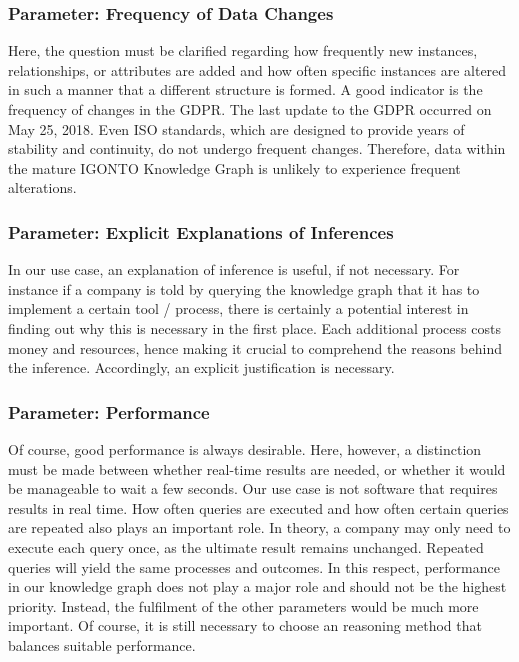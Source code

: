 \documentclass[
  a4paper,  %
  twoside,  %
  bibliography=totoc,
  headsepline,
  cleardoublepage=empty,
  parskip=half,
  draft=false
]{scrbook}
\begin{document}
\subsubsection{Parameter: Frequency of Data Changes}
Here, the question must be clarified regarding how frequently new instances, relationships, or attributes are added and how often specific instances are altered in such a manner that a different structure is formed. A good indicator is the frequency of changes in the \acrlong{GDPR}. The last update to the GDPR occurred on May 25, 2018. Even ISO standards, which are designed to provide years of stability and continuity, do not undergo frequent changes. Therefore, data within the mature IGONTO Knowledge Graph is unlikely to experience frequent alterations.

\subsubsection{Parameter: Explicit Explanations of Inferences}
In our use case, an explanation of inference is useful, if not necessary. For instance if a company is told by querying the knowledge graph that it has to implement a certain tool / process, there is certainly a potential interest in finding out why this is necessary in the first place. Each additional process costs money and resources, hence making it crucial to comprehend the reasons behind the inference. Accordingly, an explicit justification is necessary.


\subsubsection{Parameter: Performance}
Of course, good performance is always desirable. Here, however, a distinction must be made between whether real-time results are needed, or whether it would be manageable to wait a few seconds. Our use case is not software that requires results in real time. How often queries are executed and how often certain queries are repeated also plays an important role.
In theory, a company may only need to execute each query once, as the ultimate result remains unchanged. Repeated queries will yield the same processes and outcomes. In this respect, performance in our knowledge graph does not play a major role and should not be the highest priority. Instead, the fulfilment of the other parameters would be much more important. Of course, it is still necessary to choose an reasoning method that balances suitable performance.
\end{document}
